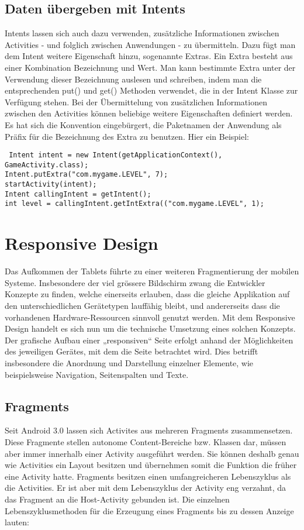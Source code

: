 \documentclass[a4paper,10pt,titlepage=false]{scrreprt}
\begin{document}
\section{Daten übergeben mit Intents}
Intents lassen sich auch dazu verwenden, zusätzliche Informationen zwischen Activities - und
folglich zwischen Anwendungen - zu übermitteln. Dazu fügt man dem Intent weitere Eigenschaft
hinzu, sogenannte Extras. Ein Extra besteht aus einer Kombination Bezeichnung und Wert. Man
kann bestimmte Extra unter der Verwendung dieser Bezeichnung auslesen und schreiben, indem
man die entsprechenden put() und get() Methoden verwendet, die in der Intent Klasse zur
Verfügung stehen.
Bei der Übermittelung von zusätzlichen Informationen zwischen den Activities können beliebige
weitere Eigenschaften definiert werden. Es hat sich die Konvention eingebürgert, die Paketnamen
der Anwendung als Präfix für die Bezeichnung des Extra zu benutzen. Hier ein Beispiel:
\begin{lstlisting}
 Intent intent = new Intent(getApplicationContext(), GameActivity.class);
Intent.putExtra("com.mygame.LEVEL", 7);
startActivity(intent);
Intent callingIntent = getIntent();
int level = callingIntent.getIntExtra(("com.mygame.LEVEL", 1);
\end{lstlisting}

\chapter{Responsive Design}
Das Aufkommen der Tablets führte zu einer weiteren Fragmentierung der mobilen Systeme.
Insbesondere der viel grössere Bildschirm zwang die Entwickler Konzepte zu finden, welche
einerseits erlauben, dass die gleiche Applikation auf den unterschiedlichen Gerätetypen lauffähig
bleibt, und andererseits dass die vorhandenen Hardware-Ressourcen sinnvoll genutzt werden.
Mit dem Responsive Design handelt es sich nun um die technische Umsetzung eines solchen
Konzepts. Der grafische Aufbau einer „responsiven“ Seite erfolgt anhand der Möglichkeiten des
jeweiligen Gerätes, mit dem die Seite betrachtet wird. Dies betrifft insbesondere die Anordnung und
Darstellung einzelner Elemente, wie beispielsweise Navigation, Seitenspalten und Texte.


\section{Fragments}
Seit Android 3.0 lassen sich Activites aus mehreren Fragments zusammensetzen. Diese Fragmente
stellen autonome Content-Bereiche bzw. Klassen dar, müssen aber immer innerhalb einer Activity
ausgeführt werden. Sie können deshalb genau wie Activities ein Layout besitzen und übernehmen
somit die Funktion die früher eine Activity hatte.
Fragments besitzen einen umfangreicheren Lebenszyklus als die Activities. Er ist aber mit dem
Lebenszyklus der Activity eng verzahnt, da das Fragment an die Host-Activity gebunden ist. Die
einzelnen Lebenszyklusmethoden für die Erzeugung eines Fragments bis zu dessen Anzeige lauten:
\end{document}
